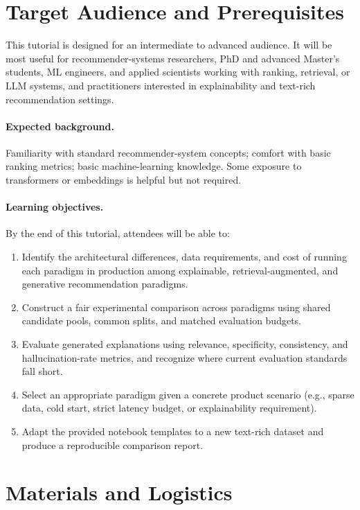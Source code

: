 \documentclass[sigconf,nonacm]{acmart}
\begin{document}
\section{Target Audience and Prerequisites}
This tutorial is designed for an intermediate to advanced audience.
It will be most useful for recommender-systems researchers, PhD and advanced Master's students, ML engineers, and applied scientists working with ranking, retrieval, or LLM systems, and practitioners interested in explainability and text-rich recommendation settings.

\paragraph{Expected background.}
Familiarity with standard recommender-system concepts; comfort with basic ranking metrics; basic machine-learning knowledge.
Some exposure to transformers or embeddings is helpful but not required.

\paragraph{Learning objectives.}
By the end of this tutorial, attendees will be able to:
\begin{enumerate}
    \item Identify the architectural differences, data requirements, and cost of running each paradigm in production among explainable, retrieval-augmented, and generative recommendation paradigms.
    \item Construct a fair experimental comparison across paradigms using shared candidate pools, common splits, and matched evaluation budgets.
    \item Evaluate generated explanations using relevance, specificity, consistency, and hallucination-rate metrics, and recognize where current evaluation standards fall short.
    \item Select an appropriate paradigm given a concrete product scenario (e.g., sparse data, cold start, strict latency budget, or explainability requirement).
    \item Adapt the provided notebook templates to a new text-rich dataset and produce a reproducible comparison report.
\end{enumerate}

\section{Materials and Logistics}
\end{document}
